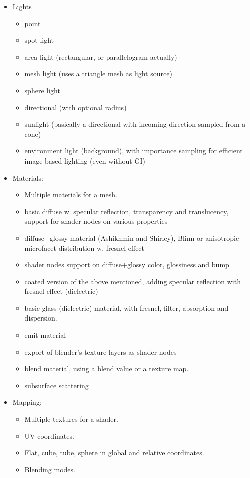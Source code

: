 \begin{itemize}
\item Lights
\begin{itemize}
\item point
\item spot light
\item area light (rectangular, or parallelogram actually)
\item mesh light (uses a triangle mesh as light source)
\item sphere light
\item directional (with optional radius)
\item sunlight (basically a directional with incoming direction sampled from a cone)
\item environment light (background), with importance sampling for efficient image-based lighting (even without GI)
\end{itemize}
\item Materials:
\begin{itemize}
\item Multiple materials for a mesh.
\item basic diffuse w. specular reflection, transparency and translucency, support for shader nodes on various properties
\item diffuse+glossy material (Ashikhmin and Shirley), Blinn or anisotropic microfacet distribution w. fresnel effect
\item shader nodes support on diffuse+glossy color, glossiness and bump
\item coated version of the above mentioned, adding specular reflection with fresnel effect (dielectric)
\item basic glass (dielectric) material, with fresnel, filter, absorption and dispersion.
\item emit material
\item export of blender's texture layers as shader nodes
\item blend material, using a blend value or a texture map.
\item subsurface scattering
\end{itemize}
\item Mapping:
\begin{itemize} 
\item Multiple textures for a shader.
\item UV coordinates.
\item Flat, cube, tube, sphere in global and relative coordinates.
\item Blending modes.

\end{itemize}
\end{itemize}
